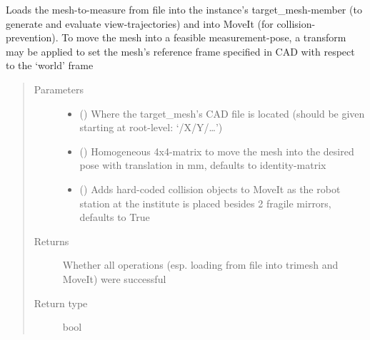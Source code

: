 \documentclass[letterpaper,10pt,english]{sphinxmanual}
\begin{document}
\begin{fulllineitems}
\begin{fulllineitems}
\label{\detokenize{module_trajectory_manager:agiprobot_measurement.trajectory_manager.TrajectoryManager.load_target_mesh}}
Loads the mesh-to-measure from file into the instance’s target\_mesh-member (to generate and evaluate view-trajectories) and into
MoveIt (for collision-prevention). To move the mesh into a feasible measurement-pose, a transform may be applied to set the mesh’s
reference frame specified in CAD with respect to the ‘world’ frame
\begin{quote}\begin{description}
\item[{Parameters}] \leavevmode\begin{itemize}
\item {} 
 () \textendash{} Where the target\_mesh’s CAD file is located (should be given starting at root-level: ‘/X/Y/…’)

\item {} 
 (\sphinxstyleliteralemphasis{, }) \textendash{} Homogeneous 4x4-matrix to move the mesh into the desired pose with translation in mm, defaults to identity-matrix

\item {} 
 (\sphinxstyleliteralemphasis{, }) \textendash{} Adds hard-coded collision objects to MoveIt as the robot station at the institute is placed besides 2 fragile mirrors, defaults to True

\end{itemize}

\item[{Returns}] \leavevmode
Whether all operations (esp. loading from file into trimesh and MoveIt) were successful

\item[{Return type}] \leavevmode
bool

\end{description}\end{quote}

\end{fulllineitems}


\end{fulllineitems}
\end{document}
